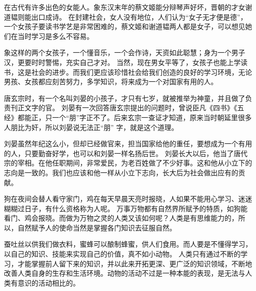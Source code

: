 \documentclass[avery5371,grid]{flashcards}
\begin{document}
{在古代有许多出色的女能人。象东汉末年的蔡文姬能分辩琴声好坏，晋朝的才女谢道韫则能出口成诗。} %
{在封建社会，女人没有地位，人们认为“女子无才便是德”，一个女孩子要读书学艺是非常困难的，蔡文姬和谢道韫两人都是女子，可以想见她们在当时学习是多么不容易。} %

{象这样的两个女孩子，一个懂音乐，一个会作诗，天资如此聪慧；身为一个男子汉，更要时时警惕，充实自己才对。} %
{当然，现在男女平等了，女孩子也能上学读书，这是社会的进步。而我们更应该珍惜社会给我们创造的良好的学习环境，无论男孩、女孩都应刻苦努力，多学知识，将来成为一个对国家有用的人。} %

{唐玄宗时，有一个名叫刘晏的小孩子，才只有七岁，就被推举为神童，并且做了负责刊正文字的官。} %
{刘晏有一次回答唐玄宗提出的问题时，曾说臣凡《四书》《五经》都能正，只一个“朋”字正不了。后来玄宗一查证才知道，原来当时朝延里很多人朋比为奸，所以刘晏说无法正“朋” 字，就是这个道理。} %

{刘晏虽然年纪这么小，但却已经做官来，担当国家给他的重任，要想成为一个有用的人，只要勤奋好学，也可以和刘晏一样名扬后世。} %
{刘晏长大以后，他当了唐代宗的宰相。在他任职期间，非常爱民，为老百姓做了不少好事。这和他从小立下的志向是一致的。我们也应该和他一样从小立下志向，长大后为社会做出应有的贡献。} %

{狗在夜间会替人看守家门，鸡在每天早晨天亮时报晓，人如果不能用心学习、迷迷糊糊过日子，有什么资格称为人呢。} %
{万事万物都有自然界所赋予的特质，如狗能看门、鸡会报晓。而做为万物之灵的人类又该如何呢？人类是有思维能力的，所以，自然赋予人的使命当然是掌握各门知识去征服自然。} %

{蚕吐丝以供我们做衣料，蜜蜂可以酿制蜂蜜，供人们食用。而人要是不懂得学习，以自己的知识、技能来实现自己的价值，真不如小动物。} %
{人类只有通过不断的学习，才能掌握前人留下来的知识，并以此来开拓更深、更广泛的知识领域，不断地改善人类自身的生存和生活环境。动物的活动不过是一种本能的表现，是无法与人类有意识的活动相比的。} %
\end{document}
